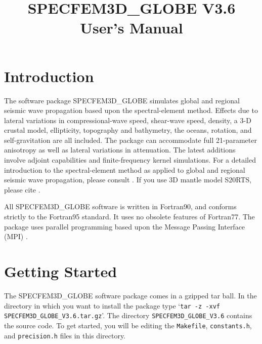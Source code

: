 \documentclass[onecolumn]{article}
\title{
\textbf{\Huge{SPECFEM3D\_GLOBE V3.6}} \\
\vspace{1.0cm}
User's Manual \\
}
\begin{document}
\maketitle

\newpage

\tableofcontents

\newpage

\section{Introduction}

The software package SPECFEM3D\_GLOBE simulates global and regional
seismic wave propagation based upon the spectral-element method.
Effects due to lateral variations in compressional-wave speed,
shear-wave speed, density, a 3-D crustal model, ellipticity,
topography and bathymetry, the oceans, rotation, and
self-gravitation are all included.
The package can accommodate full 21-parameter anisotropy as well as
lateral variations in attenuation.
The latest additions involve adjoint capabilities and finite-frequency
kernel simulations.
For a detailed introduction to the spectral-element method as applied
to global and regional seismic wave propagation, please consult
\cite{KoTr02a,KoTr02b,KoRiTr02}.
If you use 3D mantle model S20RTS, please cite \cite{ritsemaetal1999}.

All SPECFEM3D\_GLOBE software is written in Fortran90, and conforms strictly to
the Fortran95 standard. It uses no obsolete features of Fortran77.
The package uses parallel programming based upon the
Message Passing Interface (MPI) \cite{GrLuSk94,Pac97}.

\section{Getting Started}
\label{section:gettingstarted}

The SPECFEM3D\_GLOBE software package comes in a gzipped tar ball.
In the directory in which you want to install the package type
`\texttt{tar -z -xvf SPECFEM3D\_GLOBE\_V3.6.tar.gz}'.
The directory \texttt{SPECFEM3D\_GLOBE\_V3.6} contains the source code.
To get started, you will be editing the \texttt{Makefile},
\texttt{constants.h}, and \texttt{precision.h} files in this
directory.
\end{document}
